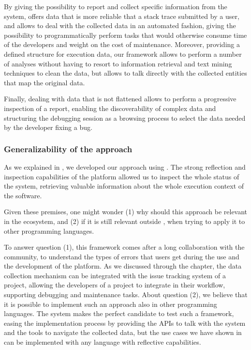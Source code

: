 By giving the possibility to report and collect specific information from the system, \sln offers data that is more reliable that a stack trace submitted by a user, and allows to deal with the collected data in an automated fashion, giving the possibility to programmatically perform tasks that would otherwise consume time of the developers and weight on the cost of maintenance.
Moreover, providing a defined structure for execution data, our framework allows to perform a number of analyses without having to resort to information retrieval and text mining techniques to clean the data, but allows to talk directly with the collected entities that map the original data.

Finally, dealing with data that is not flattened allows to perform a progressive inspection of a report, enabling the discoverability of complex data and structuring the debugging session as a browsing process to select the data needed by the developer fixing a bug.


\subsubsection{Generalizability of the approach}

As we explained in , we developed our approach using \pha.
The strong reflection and inspection capabilities of the platform allowed us to inspect the whole status of the system, retrieving valuable information about the whole execution context of the software.

Given these premises, one might wonder (1) why should this approach be relevant in the \pha ecosystem, and (2) if it is still relevant outside \pha, when trying to apply it to other programming languages.

To answer question (1), this framework comes after a long collaboration with the \pha community, to understand the types of errors that users get during the use and the development of the platform.
As we discussed through the chapter, the data collection mechanism can be integrated with the issue tracking system of a project, allowing the developers of a project to integrate \sln in their workflow, supporting debugging and maintenance tasks.
About question (2), we believe that it is possible to implement such an approach also in other programming languages.
The \pha system makes the perfect candidate to test such a framework, easing the implementation process by providing the APIs to talk with the system and the tools to navigate the collected data, but the use cases we have shown in  can be implemented with any language with reflective capabilities.

